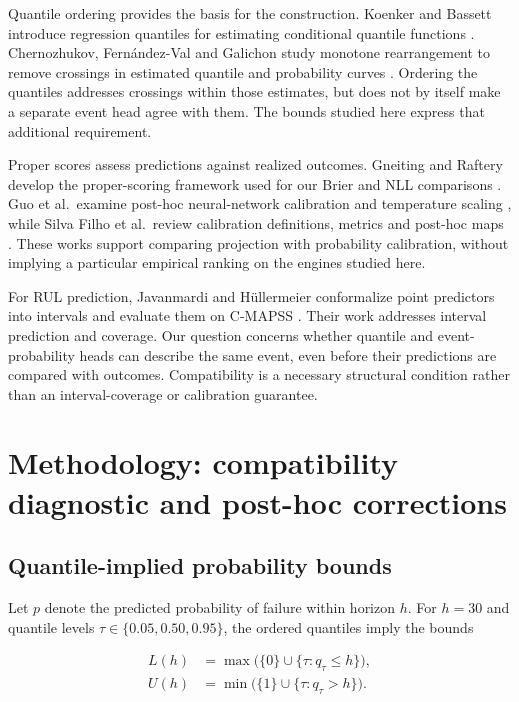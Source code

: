 \documentclass[IJPHM, 2026, 0]{phmsociety}
\begin{document}
Quantile ordering provides the basis for the construction. Koenker and Bassett introduce regression quantiles for estimating conditional quantile functions \cite{koenker1978regression}. Chernozhukov, Fernández-Val and Galichon study monotone rearrangement to remove crossings in estimated quantile and probability curves \cite{chernozhukov2010crossing}. Ordering the quantiles addresses crossings within those estimates, but does not by itself make a separate event head agree with them. The bounds studied here express that additional requirement.

Proper scores assess predictions against realized outcomes. Gneiting and Raftery develop the proper-scoring framework used for our Brier and NLL comparisons \cite{gneiting2007scoring}. Guo et al.~examine post-hoc neural-network calibration and temperature scaling \cite{guo2017calibration}, while Silva Filho et al.~review calibration definitions, metrics and post-hoc maps \cite{silvafilho2023calibration}. These works support comparing projection with probability calibration, without implying a particular empirical ranking on the engines studied here.

For RUL prediction, Javanmardi and Hüllermeier conformalize point predictors into intervals and evaluate them on C-MAPSS \cite{javanmardi2023conformal}. Their work addresses interval prediction and coverage. Our question concerns whether quantile and event-probability heads can describe the same event, even before their predictions are compared with outcomes. Compatibility is a necessary structural condition rather than an interval-coverage or calibration guarantee.

\section{Methodology: compatibility diagnostic and post-hoc corrections}

\subsection{Quantile-implied probability bounds}\label{quantile-implied-probability-bounds}

Let \(p\) denote the predicted probability of failure within horizon \(h\). For \(h=30\) and quantile levels \(\tau\in\{0.05,0.50,0.95\}\), the ordered quantiles imply the bounds

\begin{equation}
\begin{aligned}
L(h)&=\max\bigl(\{0\}\cup\{\tau:q_\tau\le h\}\bigr),\\
U(h)&=\min\bigl(\{1\}\cup\{\tau:q_\tau>h\}\bigr).
\end{aligned}
\end{equation}
\end{document}
